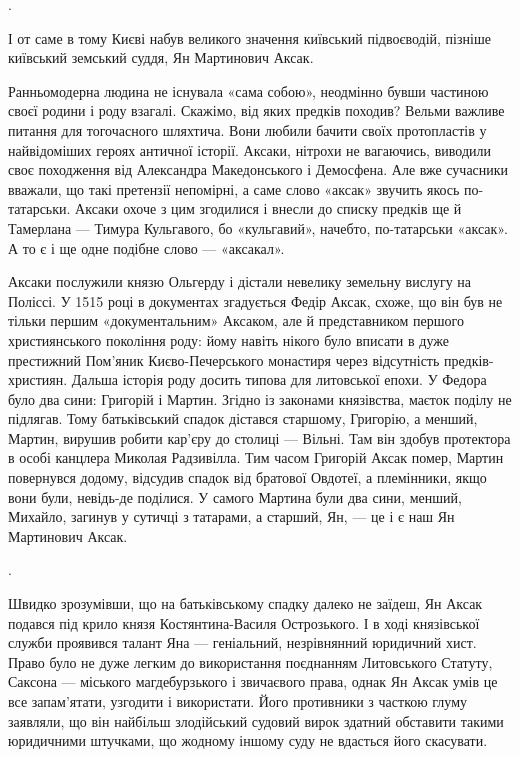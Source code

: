 
.

І от саме в тому Києві набув великого значення київський підвоєводій, пізніше
київський земський суддя, Ян Мартинович Аксак. 

Ранньомодерна людина не існувала «сама собою», неодмінно бувши частиною своєї
родини і роду взагалі. Скажімо, від яких предків походив? Вельми важливе
питання для тогочасного шляхтича. Вони любили бачити своїх протопластів у
найвідоміших героях античної історії. Аксаки, нітрохи не вагаючись, виводили
своє походження від Александра Македонського і Демосфена. Але вже сучасники
вважали, що такі претензії непомірні, а саме слово «аксак» звучить якось
по-татарськи. Аксаки охоче з цим згодилися і внесли до списку предків ще й
Тамерлана — Тимура Кульгавого, бо «кульгавий», начебто, по-татарськи «аксак». А
то є і ще одне подібне слово — «аксакал».



Аксаки послужили князю Ольгерду і дістали невелику земельну вислугу на Поліссі.
У 1515 році в документах згадується Федір Аксак, схоже, що він був не тільки
першим «документальним» Аксаком, але й представником першого християнського
покоління роду: йому навіть нікого було вписати в дуже престижний Пом’яник
Києво-Печерського монастиря через відсутність предків-християн. Дальша історія
роду досить типова для литовської епохи. У Федора було два сини: Григорій і
Мартин. Згідно із законами князівства, маєток поділу не підлягав. Тому
батьківський спадок дістався старшому, Григорію, а менший, Мартин, вирушив
робити кар’єру до столиці — Вільні. Там він здобув протектора в особі канцлера
Миколая Радзивілла. Тим часом Григорій Аксак помер, Мартин повернувся додому,
відсудив спадок від братової Овдотеї, а племінники, якщо вони були, невідь-де
поділися. У самого Мартина були два сини, менший, Михайло, загинув у сутичці з
татарами, а старший, Ян, — це і є наш Ян Мартинович Аксак.

.

Швидко зрозумівши, що на батьківському спадку далеко не заїдеш, Ян Аксак
подався під крило князя Костянтина-Василя Острозького. І в ході князівської
служби проявився талант Яна — геніальний, незрівнянний юридичний хист. Право
було не дуже легким до використання поєднанням Литовського Статуту, Саксона —
міського магдебурзького і звичаєвого права, однак Ян Аксак умів це все
запам’ятати, узгодити і використати. Його противники з часткою глуму заявляли,
що він найбільш злодійський судовий вирок здатний обставити такими юридичними
штучками, що жодному іншому суду не вдасться його скасувати.

